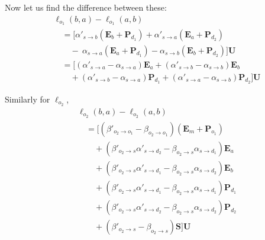 Now let us find the difference between these:
\begin{equation}
\label{eq:o1_logit_diff}
\begin{split}
    &\boldsymbol \ell_{o_1}(b,a) -\boldsymbol \ell_{o_1}(a,b) \\
    &\quad = \big[
    \alpha'_{s \to b}(\boldsymbol E_b +\boldsymbol P_{d_1})
    + \alpha'_{s \to a}(\boldsymbol E_a +\boldsymbol P_{d_2})
    \\ &\qquad 
    - \ \alpha_{s \to a}(\boldsymbol E_a +\boldsymbol P_{d_1}) 
    - \alpha_{s \to b}(\boldsymbol E_b +\boldsymbol P_{d_2})\big]\boldsymbol U
    \\
    &\quad = \big[
    (\alpha'_{s \to a} - \alpha_{s \to a})\boldsymbol E_a
    +(\alpha'_{s \to b} - \alpha_{s \to b})\boldsymbol E_b  
    \\ &\qquad 
    + (\alpha'_{s \to b} - \alpha_{s \to a})\boldsymbol P_{d_1}
    + (\alpha'_{s \to a} - \alpha_{s \to b})\boldsymbol P_{d_2}
    \big]\boldsymbol U
\end{split}
\end{equation}

Similarly for $\boldsymbol \ell_{o_2}$,
\begin{equation}
\label{eq:o2_logit_diff}
\begin{split}
    &\boldsymbol \ell_{o_2}(b,a) -\boldsymbol \ell_{o_2}(a,b) \\
    &\quad = \big[
    (\beta'_{o_2 \to o_1} - \beta_{o_2 \to o_1})(\boldsymbol E_m + \boldsymbol P_{o_1})
    \\ &\qquad 
    + (\beta'_{o_2 \to s}\alpha'_{s \to d_2}-\beta_{o_2 \to s}\alpha_{s \to d_1})\boldsymbol E_a
    \\ &\qquad
    + (\beta'_{o_2 \to s}\alpha'_{s \to d_1}-\beta_{o_2 \to s}\alpha_{s \to d_2})\boldsymbol E_b
    \\ &\qquad 
    + (\beta'_{o_2 \to s}\alpha'_{s \to d_1}-\beta_{o_2 \to s}\alpha_{s \to d_1})\boldsymbol P_{d_1}
    \\ &\qquad 
    + (\beta'_{o_2 \to s}\alpha'_{s \to d_2}-\beta_{o_2 \to s}\alpha_{s \to d_2})\boldsymbol P_{d_2}
    \\ &\qquad 
    + (\beta'_{o_2 \to s} - \beta_{o_2 \to s})\boldsymbol S
    \big]\boldsymbol U
\end{split}
\end{equation}

